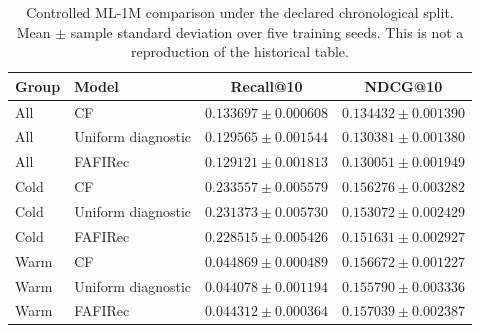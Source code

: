 \begin{table}[t]
\centering
\caption{Controlled ML-1M comparison under the declared chronological split. Mean $\pm$ sample standard deviation over five training seeds. This is not a reproduction of the historical table.}
\label{tab:ml1m_chronological_controls}
\begin{tabular}{llcc}
\toprule
Group & Model & Recall@10 & NDCG@10 \\
\midrule
All & CF & $0.133697 \pm 0.000608$ & $0.134432 \pm 0.001390$ \\
All & Uniform diagnostic & $0.129565 \pm 0.001544$ & $0.130381 \pm 0.001380$ \\
All & FAFIRec & $0.129121 \pm 0.001813$ & $0.130051 \pm 0.001949$ \\
Cold & CF & $0.233557 \pm 0.005579$ & $0.156276 \pm 0.003282$ \\
Cold & Uniform diagnostic & $0.231373 \pm 0.005730$ & $0.153072 \pm 0.002429$ \\
Cold & FAFIRec & $0.228515 \pm 0.005426$ & $0.151631 \pm 0.002927$ \\
Warm & CF & $0.044869 \pm 0.000489$ & $0.156672 \pm 0.001227$ \\
Warm & Uniform diagnostic & $0.044078 \pm 0.001194$ & $0.155790 \pm 0.003336$ \\
Warm & FAFIRec & $0.044312 \pm 0.000364$ & $0.157039 \pm 0.002387$ \\
\bottomrule
\end{tabular}
\end{table}
